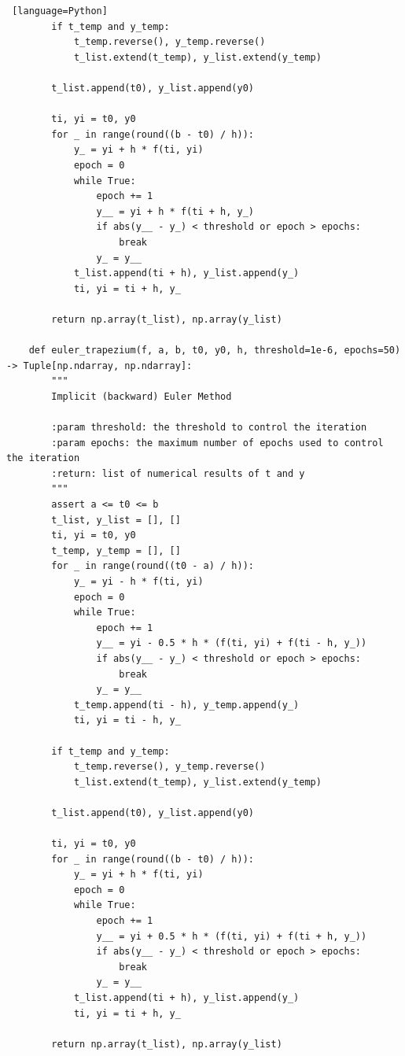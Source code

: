 \documentclass[a4paper]{article}
\begin{document}
\begin{appendices}
\begin{lstlisting} [language=Python]
        if t_temp and y_temp:
            t_temp.reverse(), y_temp.reverse()
            t_list.extend(t_temp), y_list.extend(y_temp)
    
        t_list.append(t0), y_list.append(y0)
    
        ti, yi = t0, y0
        for _ in range(round((b - t0) / h)):
            y_ = yi + h * f(ti, yi)
            epoch = 0
            while True:
                epoch += 1
                y__ = yi + h * f(ti + h, y_)
                if abs(y__ - y_) < threshold or epoch > epochs:
                    break
                y_ = y__
            t_list.append(ti + h), y_list.append(y_)
            ti, yi = ti + h, y_
    
        return np.array(t_list), np.array(y_list)
    
    def euler_trapezium(f, a, b, t0, y0, h, threshold=1e-6, epochs=50) -> Tuple[np.ndarray, np.ndarray]:
        """
        Implicit (backward) Euler Method
    
        :param threshold: the threshold to control the iteration
        :param epochs: the maximum number of epochs used to control the iteration
        :return: list of numerical results of t and y
        """
        assert a <= t0 <= b
        t_list, y_list = [], []
        ti, yi = t0, y0
        t_temp, y_temp = [], []
        for _ in range(round((t0 - a) / h)):
            y_ = yi - h * f(ti, yi)
            epoch = 0
            while True:
                epoch += 1
                y__ = yi - 0.5 * h * (f(ti, yi) + f(ti - h, y_))
                if abs(y__ - y_) < threshold or epoch > epochs:
                    break
                y_ = y__
            t_temp.append(ti - h), y_temp.append(y_)
            ti, yi = ti - h, y_
    
        if t_temp and y_temp:
            t_temp.reverse(), y_temp.reverse()
            t_list.extend(t_temp), y_list.extend(y_temp)
    
        t_list.append(t0), y_list.append(y0)
    
        ti, yi = t0, y0
        for _ in range(round((b - t0) / h)):
            y_ = yi + h * f(ti, yi)
            epoch = 0
            while True:
                epoch += 1
                y__ = yi + 0.5 * h * (f(ti, yi) + f(ti + h, y_))
                if abs(y__ - y_) < threshold or epoch > epochs:
                    break
                y_ = y__
            t_list.append(ti + h), y_list.append(y_)
            ti, yi = ti + h, y_
    
        return np.array(t_list), np.array(y_list)
    

\end{lstlisting}
\end{appendices}
\end{document}
